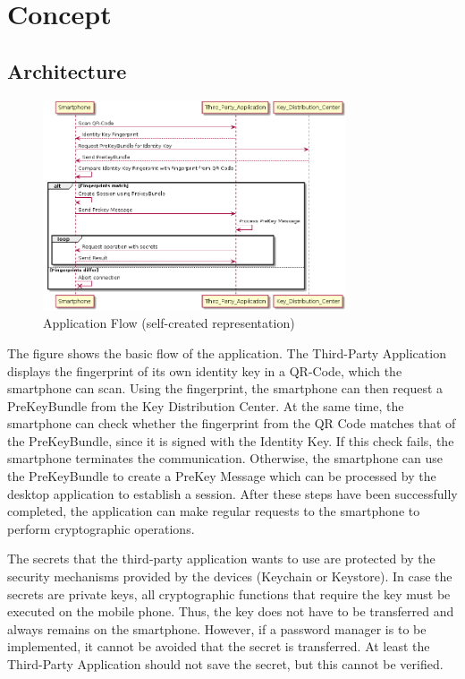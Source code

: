 \documentclass[12pt,oneside,a4paper,parskip]{scrbook}
\begin{document}
\chapter{Concept}

\section{Architecture}
\label{sec:architecture}
\begin{figure}[ht]
	\centering
  \includegraphics[width=0.8\textwidth]{ressources/process_flow.png}
  \caption{Application Flow (self-created representation)}
  \label{fig:app_flo}
\end{figure}
The figure shows the basic flow of the application. The Third-Party Application displays the fingerprint of its own identity key in a QR-Code, which the smartphone can scan. Using the fingerprint, the smartphone can then request a PreKeyBundle from the Key Distribution Center. At the same time, the smartphone can check whether the fingerprint from the QR Code matches that of the PreKeyBundle, since it is signed with the Identity Key. If this check fails, the smartphone terminates the communication. Otherwise, the smartphone can use the PreKeyBundle to create a PreKey Message which can be processed by the desktop application to establish a session. After these steps have been successfully completed, the application can make regular requests to the smartphone to perform cryptographic operations. 

The secrets that the third-party application wants to use are protected by the security mechanisms provided by the devices (Keychain or Keystore).
In case the secrets are private keys, all cryptographic functions that require the key must be executed on the mobile phone. Thus, the key does not have to be transferred and always remains on the smartphone. However, if a password manager is to be implemented, it cannot be avoided that the secret is transferred. 
At least the Third-Party Application should not save the secret, but this cannot be verified.
\end{document}
